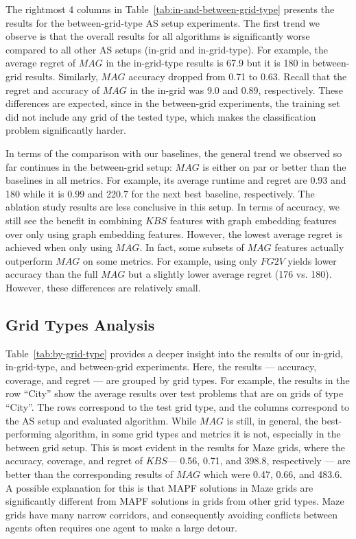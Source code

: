 \documentclass[letterpaper]{article} %
\newcommand{\fgtv}[1]{\ensuremath{\textit{FG2V}}\xspace}
\newcommand{\kaduri}[1]{\ensuremath{\textit{KBS}}\xspace}
\newcommand{\mapfgas}[1]{\ensuremath{\textit{MAG}}\xspace}
\begin{document}
The rightmost 4 columns in Table~\ref{tab:in-and-between-grid-type} presents the results for the between-grid-type AS setup experiments.
The first trend we observe is that the overall results for all algorithms is significantly worse compared to all other AS setups (in-grid and in-grid-type).
For example, the average regret of \mapfgas\ in the in-grid-type results is 67.9 but it is 180 in between-grid results. Similarly, \mapfgas\ accuracy dropped from 0.71 to 0.63. Recall that the regret and accuracy of \mapfgas\ in the in-grid
was 9.0 and 0.89, respectively. These differences are expected, since in the between-grid experiments, the training set did not include any grid of the tested type, which makes the classification problem significantly harder.


In terms of the comparison with our baselines, the general trend we observed so far continues in the between-grid setup: \mapfgas\ is either on par or better than the baselines in all metrics.
For example, its average runtime and regret are 0.93 and 180 while it is 0.99 and 220.7 for the next best baseline, respectively.
The ablation study results are less conclusive in this setup.
In terms of accuracy, we still see the benefit in combining \kaduri\ features with graph embedding features over only using graph embedding features. However, the lowest average regret is achieved when only using \mapfgas\ . In fact, some subsets of \mapfgas\ features actually outperform \mapfgas\ on some metrics. For example, using only \fgtv\ yields lower accuracy than the full \mapfgas\ but a slightly lower average regret (176 vs. 180). However, these differences are relatively small.




\subsection{Grid Types Analysis}
Table~\ref{tab:by-grid-type} provides a deeper insight into the results of our in-grid, in-grid-type, and between-grid experiments.
Here, the results --- accuracy, coverage, and regret --- are grouped by grid types.
For example, the results in the row ``City'' show the average results over test problems that are on grids of type ``City''.
The rows correspond to the test grid type, and the columns correspond to the AS setup and evaluated algorithm.
While \mapfgas\ is still, in general, the best-performing algorithm, in some grid types and metrics it is not, especially in the between grid setup.
This is most evident in the results for Maze grids, where the accuracy, coverage, and regret of \kaduri\ --- 0.56, 0.71, and 398.8, respectively --- are better than the corresponding results of \mapfgas\, which were 0.47, 0.66, and 483.6.
A possible explanation for this is that MAPF solutions in Maze grids are significantly different from MAPF solutions in grids from other grid types. Maze grids have many narrow corridors, and consequently avoiding conflicts between agents often requires one agent to make a large detour. %
\end{document}

